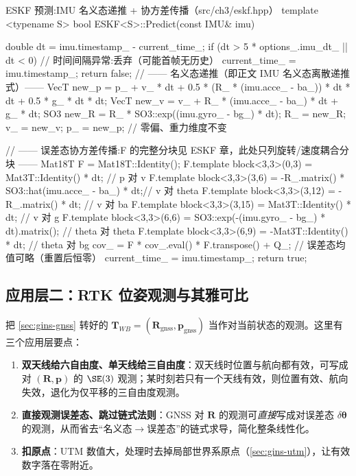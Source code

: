 \begin{codebox}[C++]{ESKF 预测:IMU 名义态递推 + 协方差传播（src/ch3/eskf.hpp）}
template <typename S>
bool ESKF<S>::Predict(const IMU& imu) {
  double dt = imu.timestamp_ - current_time_;
  if (dt > 5 * options_.imu_dt_ || dt < 0) {  // 时间间隔异常:丢弃（可能首帧无历史）
    current_time_ = imu.timestamp_;
    return false;
  }
  // —— 名义态递推（即正文 IMU 名义态离散递推式）——
  VecT new_p = p_ + v_ * dt + 0.5 * (R_ * (imu.acce_ - ba_)) * dt * dt + 0.5 * g_ * dt * dt;
  VecT new_v = v_ + R_ * (imu.acce_ - ba_) * dt + g_ * dt;
  SO3  new_R = R_ * SO3::exp((imu.gyro_ - bg_) * dt);
  R_ = new_R; v_ = new_v; p_ = new_p;   // 零偏、重力维度不变

  // —— 误差态协方差传播:F 的完整分块见 ESKF 章，此处只列旋转/速度耦合分块 ——
  Mat18T F = Mat18T::Identity();
  F.template block<3,3>(0,3)  = Mat3T::Identity() * dt;                       // p 对 v
  F.template block<3,3>(3,6)  = -R_.matrix() * SO3::hat(imu.acce_ - ba_) * dt;// v 对 theta
  F.template block<3,3>(3,12) = -R_.matrix() * dt;                            // v 对 ba
  F.template block<3,3>(3,15) =  Mat3T::Identity() * dt;                      // v 对 g
  F.template block<3,3>(6,6)  =  SO3::exp(-(imu.gyro_ - bg_) * dt).matrix();  // theta 对 theta
  F.template block<3,3>(6,9)  = -Mat3T::Identity() * dt;                      // theta 对 bg
  cov_ = F * cov_.eval() * F.transpose() + Q_;   // 误差态均值可略（重置后恒零）
  current_time_ = imu.timestamp_;
  return true;
}
\end{codebox}

\subsection{应用层二：RTK 位姿观测与其雅可比}
\label{sec:gins-rtk-update}

把 \cref{sec:gins-gnss} 转好的 $\mathbf{T}_{WB}=(\mathbf{R}_{\text{gnss}},\mathbf{p}_{\text{gnss}})$ 当作对当前状态的观测。这里有三个应用层要点\cite{gao2023slamad}：
\begin{enumerate}
  \item \textbf{双天线给六自由度、单天线给三自由度}：双天线时位置与航向都有效，可写成对 $(\mathbf{R},\mathbf{p})$ 的 $\SE(3)$ 观测；某时刻若只有一个天线有效，则位置有效、航向失效，退化为仅平移的三自由度观测。
  \item \textbf{直接观测误差态、跳过链式法则}：GNSS 对 $\mathbf{R}$ 的观测可\emph{直接}写成对误差态 $\delta\boldsymbol{\theta}$ 的观测，从而省去“名义态$\to$误差态”的链式求导，简化整条线性化。
  \item \textbf{扣原点}：UTM 数值大，处理时去掉局部世界系原点（\cref{sec:gins-utm}），让有效数字落在零附近。
\end{enumerate}

